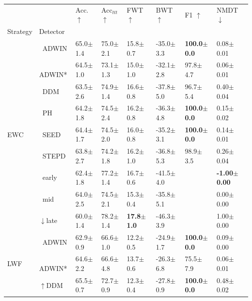 \begin{tabular}{llllllll}
\toprule
 &  & Acc. $\uparrow$ & Acc$_{ttt}$ $\uparrow$ & FWT $\uparrow$ & BWT $\uparrow$ & F1 $\uparrow$ & NMDT $\downarrow$ \\
Strategy & Detector &  &  &  &  &  &  \\
\midrule
\multirow[t]{9}{*}{EWC} & $\ \;$ADWIN & 65.0\tiny{$\pm$1.4} & 75.0\tiny{$\pm$2.1} & 15.8\tiny{$\pm$0.7} & -35.0\tiny{$\pm$3.3} & \textbf{100.0\tiny{$\pm$0.0}} & 0.08\tiny{$\pm$0.01} \\
 & $\ \;$ADWIN* & 64.5\tiny{$\pm$1.0} & 73.1\tiny{$\pm$1.3} & 15.0\tiny{$\pm$1.0} & -32.1\tiny{$\pm$2.8} & 97.8\tiny{$\pm$4.7} & 0.06\tiny{$\pm$0.01} \\
 & $\ \;$DDM & 63.5\tiny{$\pm$2.6} & 74.9\tiny{$\pm$1.4} & 16.6\tiny{$\pm$0.8} & -37.8\tiny{$\pm$5.0} & 96.7\tiny{$\pm$5.4} & 0.40\tiny{$\pm$0.04} \\
 & $\ \;$PH & 64.2\tiny{$\pm$1.8} & 74.5\tiny{$\pm$2.4} & 16.2\tiny{$\pm$0.8} & -36.3\tiny{$\pm$4.8} & \textbf{100.0\tiny{$\pm$0.0}} & 0.15\tiny{$\pm$0.02} \\
 & $\ \;$SEED & 64.4\tiny{$\pm$1.7} & 74.5\tiny{$\pm$2.0} & 16.0\tiny{$\pm$0.8} & -35.2\tiny{$\pm$3.1} & \textbf{100.0\tiny{$\pm$0.0}} & 0.14\tiny{$\pm$0.01} \\
 & $\ \;$STEPD & 63.8\tiny{$\pm$2.7} & 74.2\tiny{$\pm$1.8} & 16.2\tiny{$\pm$1.0} & -36.8\tiny{$\pm$5.3} & 98.9\tiny{$\pm$3.5} & 0.26\tiny{$\pm$0.04} \\
 & $\ \;$early & 62.4\tiny{$\pm$1.8} & 77.2\tiny{$\pm$1.4} & 16.7\tiny{$\pm$0.6} & -41.5\tiny{$\pm$4.0} &  & \textbf{-1.00\tiny{$\pm$0.00}} \\
 & $\ \;$mid & 64.0\tiny{$\pm$2.5} & 74.5\tiny{$\pm$2.1} & 15.3\tiny{$\pm$0.4} & -35.8\tiny{$\pm$5.1} &  & 0.00\tiny{$\pm$0.00} \\
 & $\downarrow$late & 60.0\tiny{$\pm$1.4} & 78.2\tiny{$\pm$1.4} & \textbf{17.8\tiny{$\pm$1.0}} & -46.3\tiny{$\pm$3.9} &  & 1.00\tiny{$\pm$0.00} \\
\midrule
\multirow[t]{9}{*}{LWF} & $\ \;$ADWIN & 62.9\tiny{$\pm$0.9} & 66.6\tiny{$\pm$1.0} & 12.2\tiny{$\pm$0.5} & -24.9\tiny{$\pm$1.7} & \textbf{100.0\tiny{$\pm$0.0}} & 0.09\tiny{$\pm$0.00} \\
 & $\ \;$ADWIN* & 64.6\tiny{$\pm$2.2} & 66.6\tiny{$\pm$4.8} & 13.7\tiny{$\pm$0.6} & -26.3\tiny{$\pm$6.8} & 75.5\tiny{$\pm$7.9} & 0.06\tiny{$\pm$0.01} \\
 & $\uparrow$DDM & 65.5\tiny{$\pm$0.7} & 72.7\tiny{$\pm$0.9} & 12.3\tiny{$\pm$0.4} & -27.8\tiny{$\pm$0.9} & \textbf{100.0\tiny{$\pm$0.0}} & 0.48\tiny{$\pm$0.02} \\

\end{tabular}
